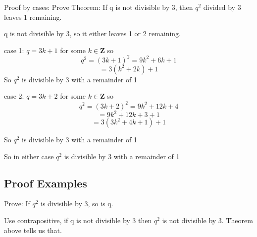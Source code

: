\documentclass[12pt]{article}
\begin{document}
Proof by cases:
Prove Theorem: If q is not divisible by 3, then $q^2$ divided by 3 leaves 1 remaining.

q is not divisible by 3, so it either leaves 1 or 2 remaining.

case 1:
$q=3k+1$ for some $k\in\mathbf{Z}$
so
$$q^2=(3k+1)^2=9k^2+6k+1$$
$$=3(k^2+2k)+1$$
So $q^2$ is divisible by 3 with a remainder of 1

case 2:
$q=3k+2$ for some $k\in\mathbf{Z}$
so
$$q^2=(3k+2)^2=9k^2+12k+4$$
$$=9k^2+12k+3+1$$
$$=3(3k^2+4k+1)+1$$

So $q^2$ is divisible by 3 with a remainder of 1

So in either case $q^2$ is divisible by 3 with a remainder of 1
\subsection{Proof Examples}
Prove: If $q^2$ is divisible by 3, so is q.

Use contrapositive, if q is not divisible by 3 then $q^2$ is not divisible by 3.
Theorem above tells us that.
\end{document}
